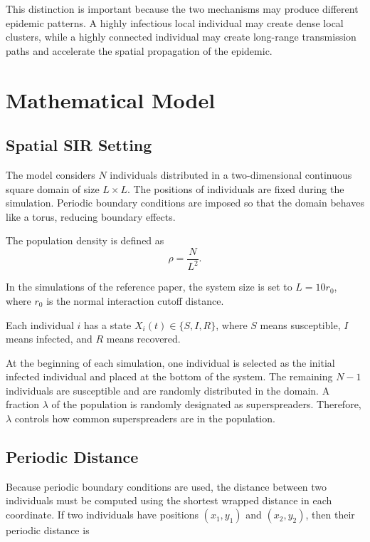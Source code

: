 \documentclass[11pt,a4paper]{article}
\begin{document}
This distinction is important because the two mechanisms may produce different epidemic patterns. A highly infectious local individual may create dense local clusters, while a highly connected individual may create long-range transmission paths and accelerate the spatial propagation of the epidemic.

\section{Mathematical Model}

\subsection{Spatial SIR Setting}

The model considers $N$ individuals distributed in a two-dimensional continuous square domain of size $L \times L$. The positions of individuals are fixed during the simulation. Periodic boundary conditions are imposed so that the domain behaves like a torus, reducing boundary effects.

The population density is defined as
\begin{equation}
    \rho = \frac{N}{L^2}.
\end{equation}

In the simulations of the reference paper, the system size is set to $L = 10r_0$, where $r_0$ is the normal interaction cutoff distance.

Each individual $i$ has a state $X_i(t) \in \{S, I, R\}$, where $S$ means susceptible, $I$ means infected, and $R$ means recovered.

At the beginning of each simulation, one individual is selected as the initial infected individual and placed at the bottom of the system. The remaining $N-1$ individuals are susceptible and are randomly distributed in the domain. A fraction $\lambda$ of the population is randomly designated as superspreaders. Therefore, $\lambda$ controls how common superspreaders are in the population.

\subsection{Periodic Distance}

Because periodic boundary conditions are used, the distance between two individuals must be computed using the shortest wrapped distance in each coordinate. If two individuals have positions $(x_1,y_1)$ and $(x_2,y_2)$, then their periodic distance is
\end{document}
